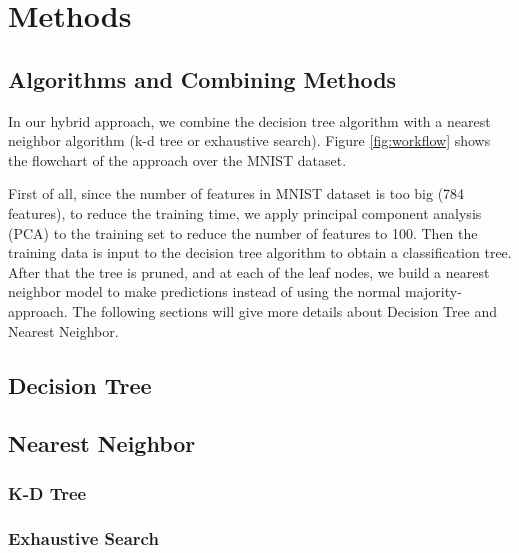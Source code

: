 \section{Methods}
	\subsection{Algorithms and Combining Methods}
		In our hybrid approach, we combine the decision tree algorithm with a nearest neighbor algorithm (k-d tree or exhaustive search). Figure \ref{fig:workflow} shows the flowchart of the approach over the MNIST dataset. 
		
		First of all, since the number of features in MNIST dataset is too big (784 features), to reduce the training time, we apply principal component analysis (PCA) to the training set to reduce the number of features to 100. Then the training data is input to the decision tree algorithm to obtain a classification tree. After that the tree is pruned, and at each of the leaf nodes, we build a nearest neighbor model to make predictions instead of using the normal majority-approach. The following sections will give more details about Decision Tree and Nearest Neighbor.
		
	\subsection{Decision Tree}
	\subsection{Nearest Neighbor}
		\subsubsection{K-D Tree}
		\subsubsection{Exhaustive Search}

